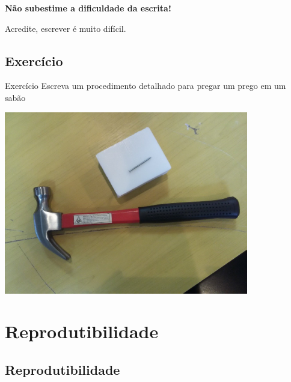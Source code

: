\documentclass{beamer}
\begin{document}

\begin{frame}{}
  \begin{block}{}
    {\bf Não subestime a dificuldade da escrita!}

    \bigskip
    Acredite, escrever é muito difícil.
  \end{block}

  \bigskip
  \bigskip
\end{frame}

\subsection{Exercício}

\begin{frame}{Exercício}
Escreva um procedimento detalhado para pregar um prego em um sabão

  \begin{center}
    \includegraphics[width=0.8\textwidth]{Intro/pregomartelo}
  \end{center}
\end{frame}

\section{Reprodutibilidade}
\subsection{Reprodutibilidade}

\end{document}
